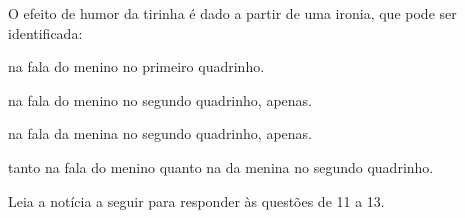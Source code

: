 \noindent O efeito de humor da tirinha é dado a partir de uma ironia, que pode ser
identificada:

\begin{escolha}
\item na fala do menino no primeiro quadrinho.
\item na fala do menino no segundo quadrinho, apenas.
\item na fala da menina no segundo quadrinho, apenas.
\item tanto na fala do menino quanto na da menina no segundo quadrinho.
\end{escolha}



\noindent Leia a notícia a seguir para responder às questões de 11 a 13.

